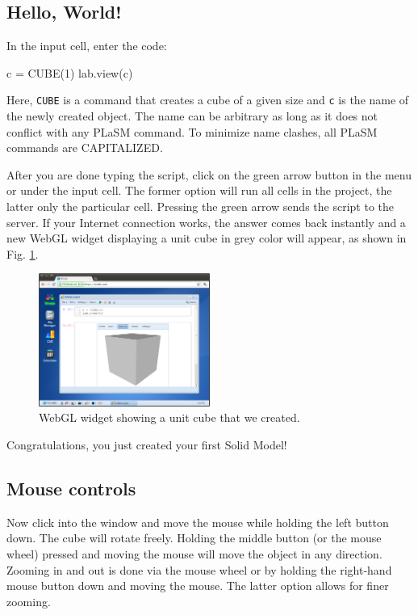 \subsection{Hello, World!}

In the input cell, enter the code:
\begin{bluecode}
c = CUBE(1)
lab.view(c)
\end{bluecode}
\noindent
Here, {\tt CUBE} is a command that creates a cube of a given size and {\tt c} is the 
name of the newly created object. The name can be arbitrary as long as it does not conflict with 
any PLaSM command. To minimize name clashes, all PLaSM commands are CAPITALIZED.

After you are done typing the script, click on the green arrow button in the menu
or under the input cell. The former option will run all cells 
in the project, the latter only the particular cell. Pressing the green arrow sends 
the script to the server. If your Internet connection works, the answer  comes back 
instantly and a new WebGL widget displaying a unit cube in grey color will appear, as 
shown in Fig. \ref{fig:cube}. 

\begin{figure}[!ht]
\begin{center}
\includegraphics[width=0.5\textwidth]{img/cube.png}
\end{center}
\vspace{-2mm}
\caption{WebGL widget showing a unit cube that we created.}
\vspace{2mm}
\label{fig:cube}
\end{figure}
\noindent
Congratulations, you just created your first Solid Model!

\subsection{Mouse controls}

Now click into the window and move the mouse while holding the left
button down. The cube will rotate freely. Holding the middle
button (or the mouse wheel) pressed and moving the mouse will move the 
object in any direction. Zooming in and out is done via the mouse wheel 
or by holding the right-hand mouse button down and moving the mouse.
The latter option allows for finer zooming.

